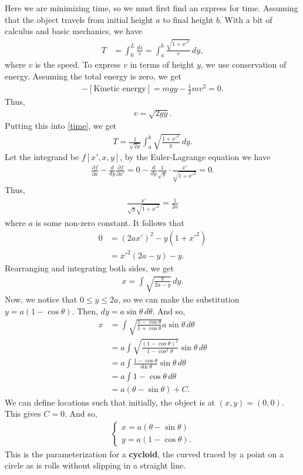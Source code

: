 \documentclass{article}
\newcommand{\p}{\partial}
\newcommand{\f}[2]{\frac{#1}{#2}}
\begin{document}
Here we are minimizing time, so we must first find an express for time. Assuming that the object travels from initial height $a$ to final height $b$. With a bit of calculus and basic mechanics, we have
\begin{align}\label{time}
T &= \int_{0}^{L} \frac{ds}{v} = \int_a^b \f{\sqrt{1 + x'^2}}{v}\,dy,
\end{align}
where $v$ is the speed. To express $v$ in terms of height $y$, we use conservation of energy. Assuming the total energy is zero, we get
\begin{align}
[\text{Potential Energy}] - [\text{Kinetic energy}] = mgy - \frac{1}{2}mv^2 = 0.
\end{align}
Thus,
\begin{align}
v = \sqrt{2gy}.
\end{align}
Putting this into \eqref{time}, we get
\begin{align}
T = \frac{1}{\sqrt{2g}}\int^b_a \sqrt{\f{1 + x'^2}{y}}\,dy.
\end{align}
Let the integrand be $f[x',x,y]$, by the Euler-Lagrange equation we have
\begin{align}
\frac{\p f}{\p x} - \f{d}{dy}\f{\p f}{\p x'} = 0 - \frac{d}{dy}\f{1}{\sqrt{y}}\cdot \f{x'}{\sqrt{1 + x'^2}}  = 0.
\end{align}
Thus,
\begin{align}
\f{x'}{\sqrt{y}\sqrt{1+x'^2}} = \f{1}{2a}
\end{align}
where $a$ is some non-zero constant. It follows that 
\begin{align}
0 &= (2ax')^2 - y(1+x'^2)\nonumber\\
&= x'^2(2a-y) - y.
\end{align}
Rearranging and integrating both sides, we get
\begin{align}
x = \int \sqrt{\frac{y}{2a-y}}\,dy.
\end{align}
Now, we notice that $0 \leq y \leq 2a$, so we can make the substitution $y = a(1-\cos\theta)$. Then, $dy = a\sin\theta\,d\theta$. And so,
\begin{align}
x 
&= \int \sqrt{\frac{1-\cos\theta}{1 + \cos\theta}}a\sin\theta\,d\theta \nonumber\\
&= a\int \sqrt{\frac{(1 - \cos\theta)^2}{1 - \cos^2\theta}}\sin\theta\,d\theta \nonumber\\
&= a\int \f{1-\cos\theta}{\sin\theta}\sin\theta\,d\theta\nonumber\\
&= a\int 1-\cos\theta \,d\theta\nonumber\\
&= a(\theta - \sin\theta) + C.
\end{align}
We can define locations such that initially, the object is at $(x,y) = (0,0)$. This gives $C = 0$. And so,
\begin{align}
\begin{cases}
x = a(\theta - \sin\theta)\\
y = a(1-\cos\theta).
\end{cases}
\end{align}
This is the parameterization for a \textbf{cycloid}, the curved traced by a point on a circle as is rolls without slipping in a straight line. 
\end{document}
